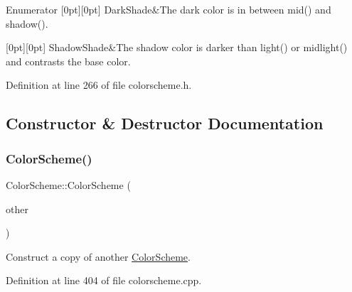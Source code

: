 \begin{DoxyEnumFields}{Enumerator}
[0pt][0pt]{}\mbox{\label{class_color_scheme_a666c52f132343e360756a126d558cdd6a38169246d060c8def931c6f6fa390f51}} 
Dark\+Shade&The dark color is in between mid() and shadow(). \\
\hline

[0pt][0pt]{}\mbox{\label{class_color_scheme_a666c52f132343e360756a126d558cdd6aa023f8d706b696065dc1c79b2335c46a}} 
Shadow\+Shade&The shadow color is darker than light() or midlight() and contrasts the base color. \\
\hline

\end{DoxyEnumFields}


Definition at line 266 of file colorscheme.\+h.



\subsection{Constructor \& Destructor Documentation}
\mbox{\label{class_color_scheme_a6ed33197f35e7e735fd18b35823007f6}} 
\subsubsection{\texorpdfstring{Color\+Scheme()}{ColorScheme()}\hspace{0.1cm}{\footnotesize\ttfamily [1/2]}}
{\footnotesize\ttfamily Color\+Scheme\+::\+Color\+Scheme (\begin{DoxyParamCaption}\item[{const \hyperlink{class_color_scheme}{Color\+Scheme} \&}]{other }\end{DoxyParamCaption})}

Construct a copy of another \hyperlink{class_color_scheme}{Color\+Scheme}. 

Definition at line 404 of file colorscheme.\+cpp.

